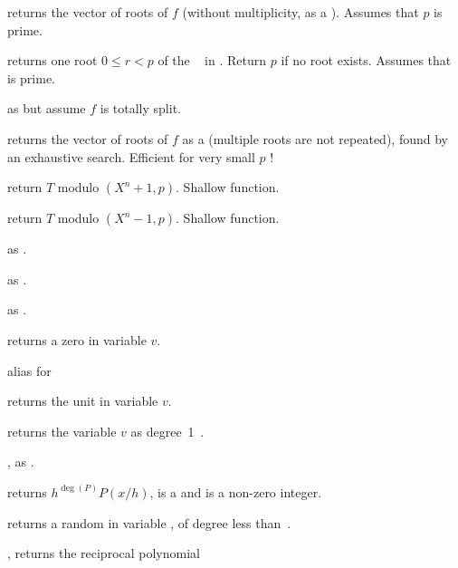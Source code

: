 
 returns the vector of roots
of $f$ (without multiplicity, as a ). Assumes that $p$ is
prime.

 returns one root $0 \leq r < p$ of
the ~ in . Return $p$ if no root exists. Assumes
that  is prime.

 as  but
assume $f$ is totally split.

 returns the vector of roots
of $f$ as a  (multiple roots are not repeated), found
by an exhaustive search. Efficient for very small $p$ !


 return $T$ modulo
$(X^n + 1, p)$. Shallow function.

 return $T$ modulo
$(X^n - 1, p)$. Shallow function.

 as .

 as
.

 as .


 returns a zero  in variable $v$.

 alias for 

 returns the unit  in variable $v$.

 returns the variable $v$ as degree~1~.

, as .

 returns $h^{\deg(P)} P(x/h)$,
 is a  and  is a non-zero integer.

 returns a random 
in variable , of degree less than~.

, returns the reciprocal polynomial

